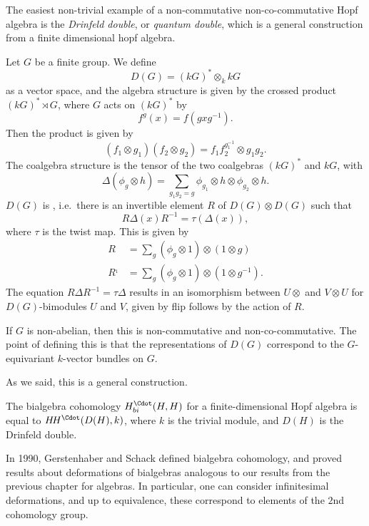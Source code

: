 \documentclass[a4paper]{article}
\newcommand\HH{H\!H}
\begin{document}
The easiest non-trivial example of a non-commutative non-co-commutative Hopf algebra is the \emph{Drinfeld double}, or \emph{quantum double}, which is a general construction from a finite dimensional hopf algebra.

\begin{defi}
  Let $G$ be a finite group. We define
  \[
    D(G) = (kG)^* \otimes_k kG
  \]
  as a vector space, and the algebra structure is given by the crossed product $(kG)^* \rtimes G$, where $G$ acts on $(kG)^*$ by
  \[
    f^g(x) = f(gxg^{-1}).
  \]
  Then the product is given by
  \[
    (f_1 \otimes g_1) (f_2 \otimes g_2) = f_1 f_2^{g_1^{-1}} \otimes g_1 g_2.
  \]
  The coalgebra structure is the tensor of the two coalgebras $(kG)^*$ and $kG$, with
  \[
    \Delta (\phi_g \otimes h) = \sum_{g_1 g_2 = g} \phi_{g_1} \otimes h \otimes \phi_{g_2} \otimes h.
  \]
  $D(G)$ is , i.e.\ there is an invertible element $R$ of $D(G) \otimes D(G)$ such that
  \[
    R \Delta (x) R^{-1} = \tau (\Delta(x)),
  \]
  where $\tau$ is the twist map. This is given by
  \begin{align*}
    R &= \sum_g (\phi_g \otimes 1) \otimes (1 \otimes g)\\
    R^{_1} &= \sum_g (\phi_g \otimes 1) \otimes (1 \otimes g^{-1}).
  \end{align*}
  The equation $R \Delta R^{-1} = \tau \Delta$ results in an isomorphism between $ U \otimes $ and $V \otimes U$ for $D(G)$-bimodules $U$ and $V$, given by flip follows by the action of $R$.
\end{defi}
If $G$ is non-abelian, then this is non-commutative and non-co-commutative. The point of defining this is that the representations of $D(G)$ correspond to the $G$-equivariant $k$-vector bundles on $G$.

As we said, this is a general construction.
\begin{thm} %
  The bialgebra cohomology $H^{\Cdot}_{bi}(H, H)$ for a finite-dimensional Hopf algebra is equal to $\HH^{\Cdot}(D(H), k)$, where $k$ is the trivial module, and $D(H)$ is the Drinfeld double.
\end{thm}
\separator

In 1990, Gerstenhaber and Schack defined bialgebra cohomology, and proved results about deformations of bialgebras analogous to our results from the previous chapter for algebras. In particular, one can consider infinitesimal deformations, and up to equivalence, these correspond to elements of the $2$nd cohomology group.
\end{document}
